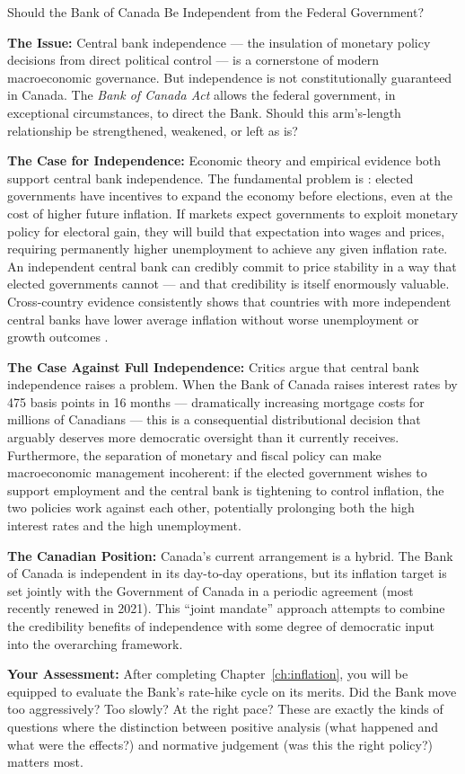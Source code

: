 \begin{policydebate}{Should the Bank of Canada Be Independent from the Federal Government?}

\textbf{The Issue:} Central bank independence --- the insulation of
monetary policy decisions from direct political control --- is a cornerstone
of modern macroeconomic governance. But independence is not constitutionally
guaranteed in Canada. The \textit{Bank of Canada Act} allows the federal
government, in exceptional circumstances, to direct the Bank. Should this
arm's-length relationship be strengthened, weakened, or left as is?

\textbf{The Case for Independence:}
Economic theory and empirical evidence both support central bank independence.
The fundamental problem is : elected governments
have incentives to expand the economy before elections, even at the cost of
higher future inflation. If markets expect governments to exploit monetary
policy for electoral gain, they will build that expectation into wages and
prices, requiring permanently higher unemployment to achieve any given
inflation rate. An independent central bank can credibly commit to price
stability in a way that elected governments cannot --- and that credibility
is itself enormously valuable. Cross-country evidence consistently shows
that countries with more independent central banks have lower average
inflation without worse unemployment or growth outcomes
\citep[see][]{alesina1993,cukierman1992}.

\textbf{The Case Against Full Independence:}
Critics argue that central bank independence raises a  problem. When the Bank of Canada raises interest rates
by 475 basis points in 16 months --- dramatically increasing mortgage
costs for millions of Canadians --- this is a consequential distributional
decision that arguably deserves more democratic oversight than it currently
receives. Furthermore, the separation of monetary and fiscal policy can
make macroeconomic management incoherent: if the elected government wishes
to support employment and the central bank is tightening to control
inflation, the two policies work against each other, potentially prolonging
both the high interest rates and the high unemployment.

\textbf{The Canadian Position:}
Canada's current arrangement is a hybrid. The Bank of Canada is independent
in its day-to-day operations, but its inflation target is set jointly
with the Government of Canada in a periodic agreement (most recently renewed
in 2021). This ``joint mandate'' approach attempts to combine the credibility
benefits of independence with some degree of democratic input into the
overarching framework.

\textbf{Your Assessment:}
After completing Chapter~\ref{ch:inflation}, you will be equipped to evaluate
the Bank's rate-hike cycle on its merits. Did the Bank move too aggressively?
Too slowly? At the right pace? These are exactly the kinds of questions where
the distinction between positive analysis (what happened and what were the
effects?) and normative judgement (was this the right policy?) matters most.
\end{policydebate}

